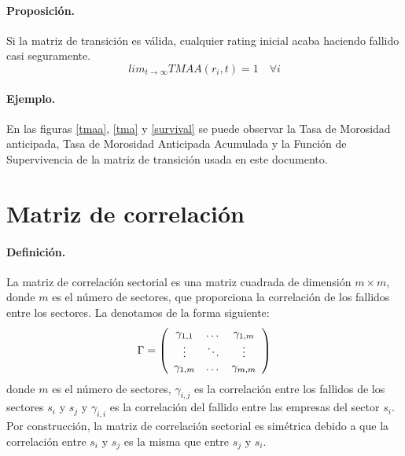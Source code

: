\paragraph{Proposici\'on.} Si la matriz de transici\'on es v\'alida, cualquier 
rating inicial acaba haciendo fallido casi seguramente.
\begin{displaymath}
lim_{t \to \infty} TMAA(r_i, t) =  1 \quad \forall i
\end{displaymath}

\paragraph{Ejemplo.} En las figuras \ref{tmaa}, \ref{tma} y \ref{survival} 
se puede observar la Tasa de Morosidad anticipada, Tasa de Morosidad Anticipada 
Acumulada y la Funci\'on de Supervivencia de la matriz de transici\'on usada en 
este documento.


\section{Matriz de correlaci\'on}
\label{sec:mcorrel}

\paragraph{Definici\'on.} La matriz de correlaci\'on sectorial es una matriz
cuadrada de dimensi\'on $m \times m$, donde $m$ es el n\'umero de sectores, 
que proporciona la correlaci\'on de los fallidos entre los sectores. 
La denotamos de la forma siguiente:
\begin{displaymath}
\Gamma = \left(
\begin{array}{ccc}
\gamma_{1,1} & \dots  & \gamma_{1,m} \cr
\vdots & \ddots & \vdots \cr
\gamma_{1,m} & \dots  & \gamma_{m,m} 
\end{array}
\right)
\end{displaymath}
donde $m$ es el n\'umero de sectores, $\gamma_{i,j}$ es la correlaci\'on entre 
los fallidos de los sectores $s_i$ y $s_j$ y $\gamma_{i,i}$ es la correlaci\'on del 
fallido entre las empresas del sector $s_i$. Por construcci\'on, la matriz de 
correlaci\'on sectorial es sim\'etrica debido a que la correlaci\'on entre $s_i$
y $s_j$ es la misma que entre $s_j$ y $s_i$.

